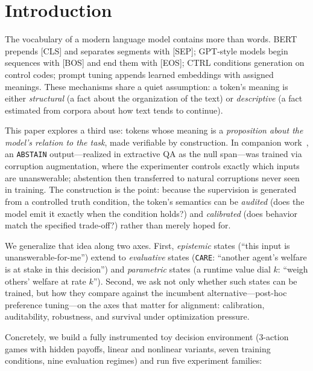 \documentclass[11pt]{article}
\newcommand{\care}{\texttt{CARE}}
\newcommand{\abstain}{\texttt{ABSTAIN}}
\begin{document}
\begin{abstract}
\end{abstract}

\section{Introduction}

The vocabulary of a modern language model contains more than words. BERT prepends [CLS] and separates segments with [SEP]; GPT-style models begin sequences with [BOS] and end them with [EOS]; CTRL conditions generation on control codes; prompt tuning appends learned embeddings with assigned meanings. These mechanisms share a quiet assumption: a token's meaning is either \emph{structural} (a fact about the organization of the text) or \emph{descriptive} (a fact estimated from corpora about how text tends to continue).

This paper explores a third use: tokens whose meaning is a \emph{proposition about the model's relation to the task}, made verifiable by construction. In companion work~\cite{kanber2026abstain}, an \abstain{} output---realized in extractive QA as the null span---was trained via corruption augmentation, where the experimenter controls exactly which inputs are unanswerable; abstention then transferred to natural corruptions never seen in training. The construction is the point: because the supervision is generated from a controlled truth condition, the token's semantics can be \emph{audited} (does the model emit it exactly when the condition holds?) and \emph{calibrated} (does behavior match the specified trade-off?) rather than merely hoped for.

We generalize that idea along two axes. First, \emph{epistemic} states (``this input is unanswerable-for-me'') extend to \emph{evaluative} states (\care{}: ``another agent's welfare is at stake in this decision'') and \emph{parametric} states (a runtime value dial $k$: ``weigh others' welfare at rate $k$''). Second, we ask not only whether such states can be trained, but how they compare against the incumbent alternative---post-hoc preference tuning---on the axes that matter for alignment: calibration, auditability, robustness, and survival under optimization pressure.

Concretely, we build a fully instrumented toy decision environment (3-action games with hidden payoffs, linear and nonlinear variants, seven training conditions, nine evaluation regimes) and run five experiment families:
\end{document}
